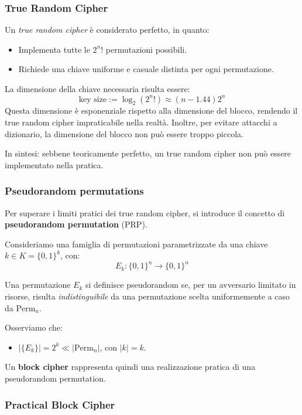 \documentclass{report}
\begin{document}
\subsubsection{True Random Cipher}

Un \textit{true random cipher} è considerato perfetto, in quanto:

\begin{itemize}
    \item Implementa tutte le $2^n!$ permutazioni possibili.
    \item Richiede una chiave uniforme e casuale distinta per ogni permutazione.
\end{itemize}

La dimensione della chiave necessaria risulta essere:
\[
\text{key size} := \log_2(2^n!) \approx (n - 1.44)2^n
\]
Questa dimensione è esponenziale rispetto alla dimensione del blocco, rendendo il true random cipher impraticabile nella realtà.  
Inoltre, per evitare attacchi a dizionario, la dimensione del blocco non può essere troppo piccola.

In sintesi: sebbene teoricamente perfetto, un true random cipher non può essere implementato nella pratica.

\subsubsection{Pseudorandom permutations}

Per superare i limiti pratici dei true random cipher, si introduce il concetto di \textbf{pseudorandom permutation} (PRP).

Consideriamo una famiglia di permutazioni parametrizzate da una chiave $k \in K = \{0,1\}^k$, con:
\[
E_k: \{0,1\}^n \rightarrow \{0,1\}^n
\]

Una permutazione $E_k$ si definisce pseudorandom se, per un avversario limitato in risorse, risulta \textit{indistinguibile} da una permutazione scelta uniformemente a caso da $\text{Perm}_n$.

Osserviamo che:
\begin{itemize}
    \item $|\{E_k\}| = 2^k \ll |\text{Perm}_n|$, con $|k| = k$.
\end{itemize}

Un \textbf{block cipher} rappresenta quindi una realizzazione pratica di una pseudorandom permutation.

\subsubsection{Practical Block Cipher}
\end{document}
